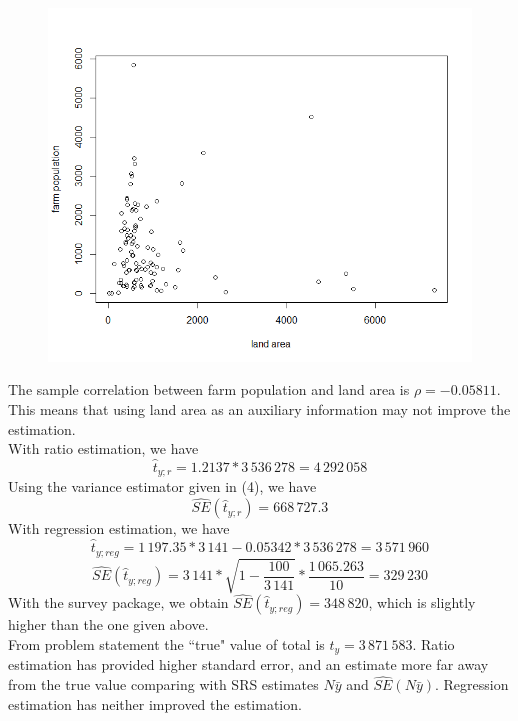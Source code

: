 \documentclass[12pt]{article}
\begin{document}
\begin{enumerate}
{\begin{minipage}[t]{0.97\linewidth}
\begin{figure}[H]
\begin{center}
\includegraphics[scale=0.7]{Ex2_6_3.png}
\end{center}
\end{figure}
The sample correlation between farm population and land area is $\rho=-0.05811$. This means that using land area as an auxiliary information may not improve the estimation.\\
With ratio estimation, we have 
$$\hat{t}_{y;r}=1.2137*3\,536\,278=4\,292\,058$$
Using the variance estimator given in (4), we have 
$$\widehat{SE}(\hat{t}_{y;r})=668\,727.3$$ 
With regression estimation, we have 
$$\hat{t}_{y;reg}=1\,197.35 *3\,141 -0.05342*3\,536\,278=3\,571\,960$$
$$\widehat{SE}(\hat{t}_{y;reg})=3\,141*\sqrt{1-\frac{100}{3\,141}}*\frac{1\,065.263}{10}=329\,230$$
With the survey package, we obtain $\widehat{SE}(\hat{t}_{y;reg})=348\,820$, which is slightly higher than the one given above.\\
From problem statement the ``true" value of total is $t_y=3\,871\,583$. Ratio estimation has provided higher standard error, and an estimate more far away from the true value comparing with SRS estimates $N\bar{y}$ and $\widehat{SE}(N\bar{y})$. Regression estimation has neither improved the estimation. \\
\end{minipage}}
\end{enumerate}
\end{document}
